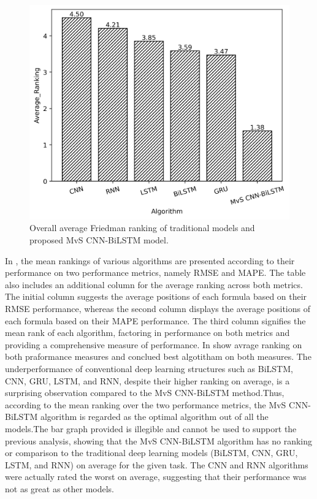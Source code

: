 \documentclass[a4paper, fleqn]{cas-sc}
\theoremstyle{definition}
\theoremstyle{remark}
\begin{document}
  \begin{figure}[h!]
    \centering
    \includegraphics[scale=0.7]{avg_Rank_plot}
    \caption{Overall average Friedman ranking of traditional models and proposed MvS CNN-BiLSTM model.}
    \label{avg_Rank_plot}
  \end{figure}
  In ,  the mean rankings of various algorithms are presented according to their performance on two performance metrics,  namely RMSE and MAPE. The table also includes an additional column for the average ranking across both metrics. The initial column suggests the average positions of each formula based on their RMSE performance,  whereas the second column displays the average positions of each formula based on their MAPE performance. The third column signifies the mean rank of each algorithm,  factoring in performance on both metrics and providing a comprehensive measure of performance. In  show avrage ranking on both praformance measures and conclued best algotitham on both measures. The underperformance of conventional deep learning structures such as BiLSTM,  CNN,  GRU,  LSTM,  and RNN,  despite their higher ranking on average,  is a surprising observation compared to the MvS CNN-BiLSTM method.Thus,  according to  the mean ranking over the two performance metrics,  the MvS CNN-BiLSTM algorithm is regarded as the optimal algorithm out of all the models.The bar graph provided is illegible and cannot be used to support the previous analysis,  showing that the MvS CNN-BiLSTM algorithm has no ranking or comparison to the traditional deep learning models (BiLSTM,  CNN,  GRU,  LSTM,  and RNN) on average for the given task. The CNN and RNN algorithms were actually rated the worst on average,  suggesting that their performance was not as great as other models.
\end{document}
